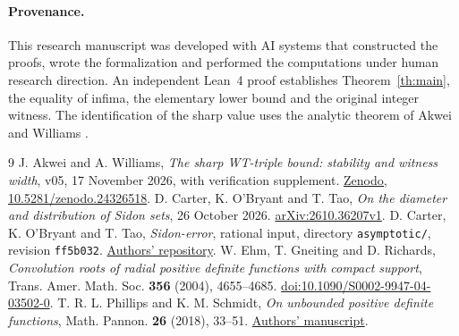\documentclass[11pt]{article}
\begin{document}
\paragraph{Provenance.}
This research manuscript was developed with AI systems that constructed the proofs, wrote the formalization and performed the computations under human research direction. An independent Lean~4 proof establishes Theorem~\ref{th:main}, the equality of infima, the elementary lower bound and the original integer witness. The identification of the sharp value uses the analytic theorem of Akwei and Williams \cite{aw}.

\begin{thebibliography}{9}
 J. Akwei and A. Williams, \emph{The sharp WT-triple bound: stability and witness width}, v05, 17 November 2026, with verification supplement. \href{https://doi.org/10.5281/zenodo.24326518}{Zenodo, 10.5281/zenodo.24326518}.
 D. Carter, K. O'Bryant and T. Tao, \emph{On the diameter and distribution of Sidon sets}, 26 October 2026. \href{https://arxiv.org/abs/2610.36207v1}{arXiv:2610.36207v1}.
 D. Carter, K. O'Bryant and T. Tao, \emph{Sidon-error}, rational input, directory \texttt{asymptotic/}, revision \texttt{ff5b032}. \href{https://github.com/dcartermath/sidon-error/tree/ff5b032fc3745140549777a96a9ec3ba7f8dd954/asymptotic}{Authors' repository}.
 W. Ehm, T. Gneiting and D. Richards, \emph{Convolution roots of radial positive definite functions with compact support}, Trans. Amer. Math. Soc. \textbf{356} (2004), 4655--4685. \href{https://doi.org/10.1090/S0002-9947-04-03502-0}{doi:10.1090/S0002-9947-04-03502-0}.
 T. R. L. Phillips and K. M. Schmidt, \emph{On unbounded positive definite functions}, Math. Pannon. \textbf{26} (2018), 33--51. \href{https://orca.cardiff.ac.uk/id/eprint/115573/1/Bochner4c.pdf}{Authors' manuscript}.
\end{thebibliography}
\end{document}
